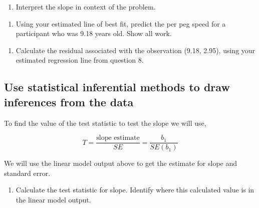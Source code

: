 \documentclass[
]{report}
\providecommand{\tightlist}{%
  \setlength{\itemsep}{0pt}\setlength{\parskip}{0pt}}
\begin{document}
\vspace{1in}

\begin{enumerate}
\def\labelenumi{\arabic{enumi}.}
\setcounter{enumi}{8}
\tightlist
\item
  Interpret the slope in context of the problem.
\end{enumerate}

\vspace{1in}

\begin{enumerate}
\def\labelenumi{\arabic{enumi}.}
\setcounter{enumi}{9}
\tightlist
\item
  Using your estimated line of best fit, predict the per peg speed for a participant who was 9.18 years old. Show all work.
\end{enumerate}

\vspace{1in}

\begin{enumerate}
\def\labelenumi{\arabic{enumi}.}
\setcounter{enumi}{10}
\tightlist
\item
  Calculate the residual associated with the observation (9.18, 2.95), using your estimated regression line from question 8.
\end{enumerate}

\vspace{1in}

\hypertarget{use-statistical-inferential-methods-to-draw-inferences-from-the-data}{%
\subsection*{Use statistical inferential methods to draw inferences from the data}\label{use-statistical-inferential-methods-to-draw-inferences-from-the-data}}

To find the value of the test statistic to test the slope we will use,

\[
T = \frac{\mbox{slope estimate}}{SE} = \frac{b_1}{SE(b_1)}
\]

We will use the linear model output above to get the estimate for slope and standard error.

\begin{enumerate}
\def\labelenumi{\arabic{enumi}.}
\setcounter{enumi}{11}
\tightlist
\item
  Calculate the test statistic for slope. Identify where this calculated value is in the linear model output.
\end{enumerate}
\end{document}
